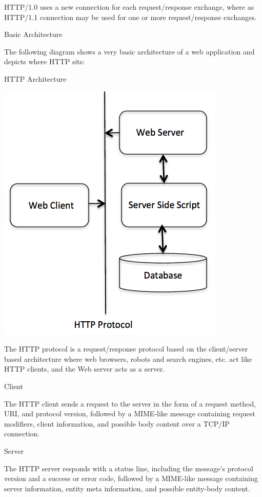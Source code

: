 \documentclass[a4paper,11pt,bahasa]{extarticle}
\begin{document}
HTTP/1.0 uses a new connection for each request/response exchange,
where as HTTP/1.1 connection may be used for one or more request/response exchanges.

Basic Architecture

The following diagram shows a very basic architecture of a web application and
depicts where HTTP sits:

HTTP Architecture

{\centering
\includegraphics[scale=1.0]{images/cgiarch.png}
}

The HTTP protocol is a request/response protocol based on the client/server based architecture 
where web browsers, robots and search engines, etc. act like HTTP clients, and the Web server 
acts as a server.

Client

The HTTP client sends a request to the server in the form of a request method, URI, and protocol 
version, followed by a MIME-like message containing request modifiers, client information, and 
possible body content over a TCP/IP connection.

Server

The HTTP server responds with a status line, including the message's protocol version and a 
success or error code, followed by a MIME-like message containing server information, entity meta 
information, and possible entity-body content.
\end{document}

